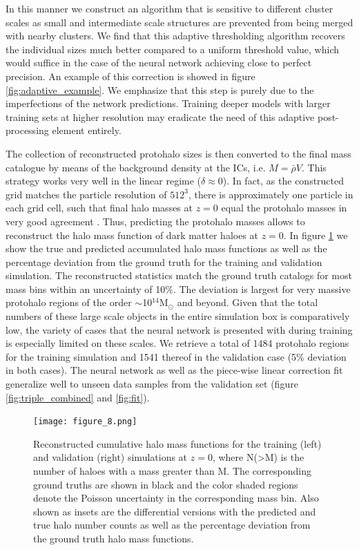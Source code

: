 \documentclass[fleqn,usenatbib]{mnras}
\newcommand{\Msun}{\text{M}_{\odot}}	%
\begin{document}
In this manner we construct an algorithm that is sensitive to different cluster scales as small and intermediate scale structures are prevented from being merged with nearby clusters. We find that this adaptive thresholding algorithm recovers the individual sizes much better compared to a uniform threshold value, which would suffice in the case of the neural network achieving close to perfect precision.
An example of this correction is showed in figure \ref{fig:adaptive_example}.
We emphasize that this step is purely due to the imperfections of the network predictions. Training deeper models with larger training sets at higher resolution may eradicate the need of this adaptive post-processing element entirely.\par
The collection of reconstructed protohalo sizes is then converted to the final mass catalogue by means of the background density at the ICs, i.e. $M=\bar{\rho}V$. This strategy works very well in the linear regime ($\delta \approx 0$). In fact, as the constructed grid matches the particle resolution of $512^{3}$, there is approximately one particle in each grid cell, such that final halo masses at $z=0$ equal the protohalo masses in very good agreement
. Thus, predicting the protohalo masses allows to reconstruct the halo mass function of dark matter haloes at $z=0$. In figure \ref{fig:hmfT} we show the true and predicted accumulated halo mass functions as well as the percentage deviation from the ground truth for the training and validation simulation. The reconstructed statistics match the ground truth catalogs for most mass bins within an uncertainty of 10\%. The deviation is largest for very massive protohalo regions of the order $\sim$10$^{14}\Msun$ and beyond. Given that the total numbers of these large scale objects in the entire simulation box is comparatively low, the variety of cases that the neural network is presented with during training is especially limited on these scales. We retrieve a total of 1484 protohalo regions for the training simulation and 1541 thereof in the validation case (5\% deviation in both cases). The neural network as well as the piece-wise linear correction fit generalize well to unseen data samples from the validation set (figure \ref{fig:triple_combined} and \ref{fig:fit}).

\begin{figure}
 \texttt{[image: figure\_8.png]}
 \caption{Reconstructed cumulative halo mass functions for the training (left) and validation (right) simulations at $z=0$, where N(>M) is the number of haloes with a mass greater than M. The corresponding ground truths are shown in black and the color shaded regions denote the Poisson uncertainty in the corresponding mass bin. Also shown as insets are the differential versions with the predicted and true halo number counts as well as the percentage deviation from the ground truth halo mass functions.}
 \label{fig:hmfT}
\end{figure}
\end{document}
